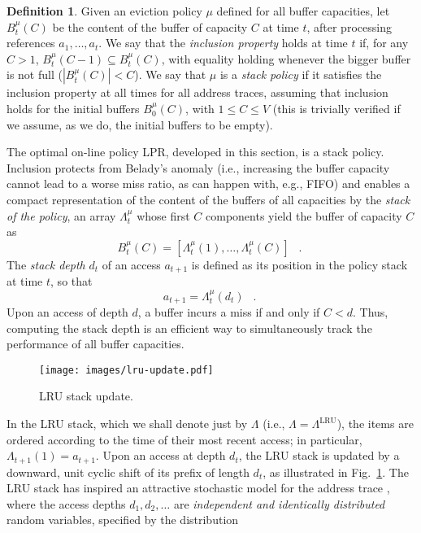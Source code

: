 \documentclass[11pt,a4paper]{article}
\DeclareMathOperator{\lru}{LRU}
\DeclareMathOperator{\mf}{\enspace .}
\theoremstyle{definition}
\newtheorem{definition}{Definition}
\theoremstyle{remark}
\begin{document}
\begin{definition}\label{def:stackPolicy} Given an eviction policy $\mu$
defined for all buffer capacities, let $B_t^\mu(C)$ be the content of
the buffer of capacity $C$ at time $t$, after processing references
$a_1,\ldots,a_{t}$.
We say that the \emph{inclusion property} holds at time $t$ if, for any $C>1$,
$B_t^\mu(C-1) \subseteq B_t^\mu(C)$, with equality holding whenever the bigger
buffer is not full ($\left|B_t^\mu(C)\right| < C$).
We say that $\mu$ is a \emph{stack policy} if it satisfies the inclusion
property at all times for all address traces, assuming that inclusion holds for
the initial buffers $B_0^\mu(C)$, with $1 \leq C \leq V$ (this is trivially
verified if we assume, as we do, the initial buffers to be empty).
\end{definition}
The optimal on-line policy LPR, developed in this section, is a stack
policy.
Inclusion protects from Belady's anomaly \cite{BeladyNS69} (i.e.,
increasing the buffer capacity cannot lead to a worse miss ratio, as
can happen with, e.g., FIFO) and enables a compact representation of
the content of the buffers of all capacities by the \emph{stack of the
policy}, an array $\Lambda^\mu_t$ whose first $C$ components yield the
buffer of capacity $C$ as
\begin{equation}
B_t^\mu(C)= \left[ \Lambda^\mu_t(1), \ldots, \Lambda^\mu_t(C) \right] \mf
\end{equation}
The \emph{stack depth} $d_t$ of an access $a_{t+1}$ is defined as its
position in the policy stack at time $t$, so that
\begin{equation}
a_{t+1}=\Lambda^\mu_{t}(d_t) \mf
\end{equation} 
Upon an access of depth $d$, a buffer incurs a miss if and only if $C<d$. Thus,
computing the stack depth is an efficient way to simultaneously track the
performance of all buffer capacities.

\begin{figure}
  \centering  \texttt{[image: images/lru-update.pdf]}
  \caption{LRU stack update.}
  \label{lru-up}
\end{figure}

In the LRU stack, which we shall denote just by $\Lambda$ (i.e.,
$\Lambda=\Lambda^{\lru}$), the items are ordered according to the time
of their most recent access; in particular,
$\Lambda_{t+1}(1)=a_{t+1}$. Upon an access at depth $d_t$, the LRU
stack is updated by a downward, unit cyclic shift of its prefix of
length $d_t$, as illustrated in Fig.~\ref{lru-up}. The LRU stack has
inspired an attractive stochastic model for the address trace
\cite{OdenS72,SpirnD72,TurnerS77,EffelsbergH84,KobayashiM89}, where the
access depths $d_1,d_2, \ldots$ are \emph{independent and identically
distributed} random variables, specified by the distribution
\end{document}
